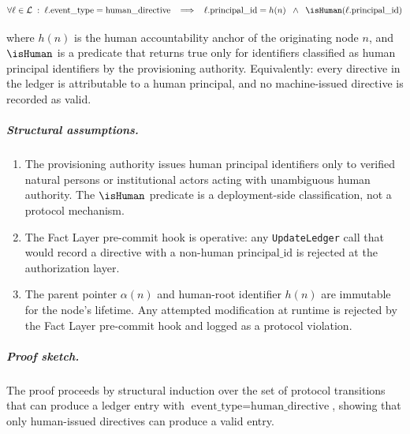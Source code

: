 \begin{equation}
\forall \ell \in \mathcal{L} \;:\; \ell.\text{event\_type} = \text{human\_directive}
\;\;\implies\;\;
\ell.\text{principal\_id} = h(n)
\;\;\land\;\;
\isHuman(\ell.\text{principal\_id})
\end{equation}

where $h(n)$ is the human accountability anchor of the originating node $n$, and $\isHuman$ is a predicate that returns true only for identifiers classified as human principal identifiers by the provisioning authority. Equivalently: every directive in the ledger is attributable to a human principal, and no machine-issued directive is recorded as valid.

\subparagraph{Structural assumptions.}
\begin{enumerate}
\item[\textbf{A3.1}] The provisioning authority issues human principal identifiers only to verified natural persons or institutional actors acting with unambiguous human authority. The $\isHuman$ predicate is a deployment-side classification, not a protocol mechanism.
\item[\textbf{A3.2}] The Fact Layer pre-commit hook is operative: any \texttt{UpdateLedger} call that would record a directive with a non-human $\text{principal\_id}$ is rejected at the authorization layer.
\item[\textbf{A3.3}] The parent pointer $\alpha(n)$ and human-root identifier $h(n)$ are immutable for the node's lifetime. Any attempted modification at runtime is rejected by the Fact Layer pre-commit hook and logged as a protocol violation.
\end{enumerate}

\subparagraph{Proof sketch.} The proof proceeds by structural induction over the set of protocol transitions that can produce a ledger entry with $\text{event\_type} = \text{human\_directive}$, showing that only human-issued directives can produce a valid entry.

